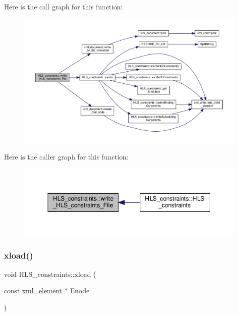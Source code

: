 Here is the call graph for this function\+:
\nopagebreak
\begin{figure}[H]
\begin{center}
\leavevmode
\includegraphics[width=350pt]{dd/d96/classHLS__constraints_ad69227a7f2d1c6266571737752438e21_cgraph}
\end{center}
\end{figure}
Here is the caller graph for this function\+:
\nopagebreak
\begin{figure}[H]
\begin{center}
\leavevmode
\includegraphics[width=347pt]{dd/d96/classHLS__constraints_ad69227a7f2d1c6266571737752438e21_icgraph}
\end{center}
\end{figure}
\mbox{\label{classHLS__constraints_ae9f1030321791e339e7ced72f1d00cb1}} 
\subsubsection{\texorpdfstring{xload()}{xload()}}
{\footnotesize\ttfamily void H\+L\+S\+\_\+constraints\+::xload (\begin{DoxyParamCaption}\item[{const \hyperlink{classxml__element}{xml\+\_\+element} $\ast$}]{Enode }\end{DoxyParamCaption})}



